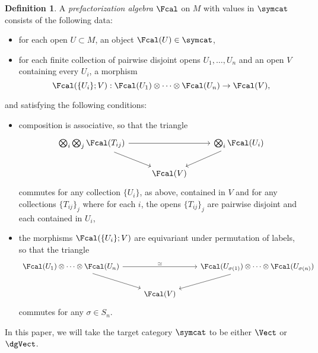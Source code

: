 \documentclass[12pt]{amsart}
\theoremstyle{definition}
\newtheorem{dfn}[theorem]{Definition}
\theoremstyle{remark}
\begin{document}
\begin{dfn}
A {\it prefactorization algebra} $\Fcal$ on $M$ with values in $\symcat$ consists of the following data:
\begin{itemize}
\item for each open $U \subset M$, an object $\Fcal(U) \in \symcat $,
\item for each finite collection of pairwise disjoint opens $U_1,\ldots,U_n$ and an open $V$ containing every $U_i$, a morphism
\[
\Fcal(\{U_i\}; V): \Fcal(U_1) \otimes \cdots \otimes \Fcal(U_n) \to \Fcal(V),
\]
\end{itemize}
and satisfying the following conditions:
\begin{itemize}
\item composition is associative, so that the triangle
\[
\begin{tikzcd}
\bigotimes_i \bigotimes_j \Fcal(T_{ij}) \arrow{rr} \arrow{rd} &&\bigotimes_i \Fcal(U_{i}) \arrow{ld} \\
&\Fcal(V)&
\end{tikzcd}
\]
commutes for any collection $\{U_i\}$, as above, contained in $V$ and for any collections $\{T_{ij}\}_j$ where for each $i$, the opens $\{T_{ij}\}_j$ are pairwise disjoint and each contained in $U_i$,
\item the morphisms $\Fcal(\{U_i\}; V)$ are equivariant under permutation of labels, so that the triangle
\[
\begin{tikzcd}
\Fcal(U_{1}) \otimes \cdots \otimes \Fcal(U_n) \arrow{rr}{\simeq} \arrow{rd} && \Fcal(U_{\sigma(1)}) \otimes \cdots \otimes \Fcal(U_{\sigma(n)}) \arrow{ld}\\
&\Fcal(V)&
\end{tikzcd}
\]
commutes for any $\sigma \in S_n$.
\end{itemize}
\end{dfn}

In this paper, we will take the target category $\symcat$ to be either $\Vect$ or $\dgVect$. 
\end{document}
